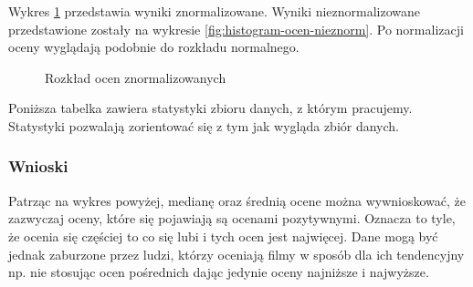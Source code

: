 \documentclass[12pt, a4paper]{article}
\begin{document}
Wykres \ref{fig:histogram-ocen-norm} przedstawia wyniki znormalizowane. Wyniki nieznormalizowane przedstawione zostały na wykresie \ref{fig:histogram-ocen-nieznorm}. Po normalizacji oceny wyglądają podobnie do rozkładu normalnego.
\begin{figure}[H]
  \begin{center}
  \end{center}
  \caption{Rozkład ocen znormalizowanych}
  \label{fig:histogram-ocen-norm}
\end{figure}

Poniższa tabelka zawiera statystyki zbioru danych, z którym pracujemy. Statystyki pozwalają zorientować się z tym jak wygląda zbiór danych.


\subsubsection{Wnioski}
Patrząc na wykres powyżej, medianę oraz średnią ocene można wywnioskować, że zazwyczaj oceny, które się pojawiają są ocenami pozytywnymi. Oznacza to tyle, że ocenia się częściej to co się lubi i tych ocen jest najwięcej. Dane mogą być jednak zaburzone przez ludzi, którzy oceniają filmy w sposób dla ich tendencyjny np. nie stosując ocen pośrednich dając jedynie oceny najniższe i najwyższe.
\end{document}
